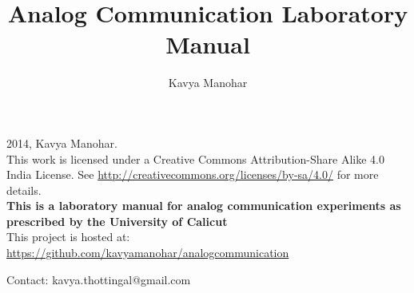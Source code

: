 \documentclass{book}
\begin{document}
\thispagestyle{empty}
\thispagestyle{empty}

\title{Analog Communication
Laboratory Manual}
\author{Kavya Manohar} {%
\maketitle
  
\noindent \textcopyright{}2014, Kavya Manohar.\\
\noindent
This work is licensed under a Creative Commons Attribution-Share Alike 4.0 India License. See \url{http://creativecommons.org/licenses/by-sa/4.0/} for more details.
\\[5cm]

\noindent \textbf{This is a laboratory manual for analog communication experiments as prescribed by the University of Calicut}
\\

\noindent This project is hosted at:  \url{https://github.com/kavyamanohar/analogcommunication}


\noindent Contact: kavya.thottingal@gmail.com


\clearpage
\thispagestyle{plain}







\thispagestyle{empty}
\tableofcontents
\thispagestyle{empty}
\thispagestyle{empty}

\listoffigures
\thispagestyle{empty}




%
%




%
%
%

}
\end{document}
